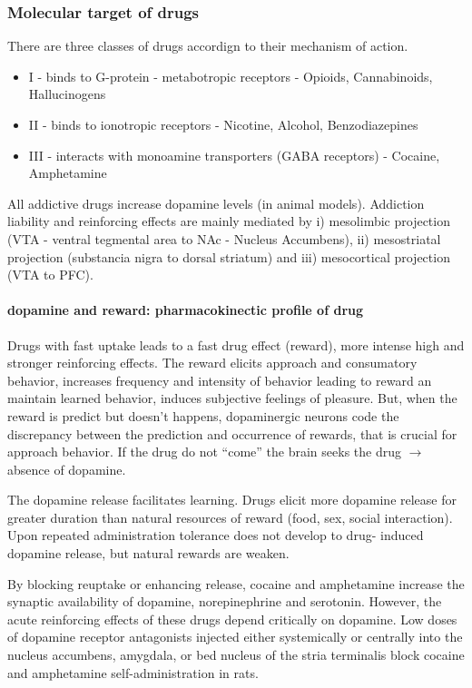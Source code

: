 \documentclass[12pt,article,oneside,a4paper]{memoir}
\begin{document}
\subsubsection{Molecular target of drugs}
There are three classes of drugs accordign to their mechanism of action.

\begin{itemize}
\item I - binds to G-protein - metabotropic receptors - Opioids, Cannabinoids,
Hallucinogens
\item II - binds to ionotropic receptors - Nicotine, Alcohol, Benzodiazepines
\item III - interacts with monoamine transporters (GABA receptors) - Cocaine, Amphetamine
\end{itemize}

All addictive drugs increase dopamine levels (in animal models). Addiction
liability and reinforcing effects are mainly mediated by i) mesolimbic
projection (VTA - ventral tegmental area to NAc - Nucleus Accumbens), ii)
mesostriatal projection (substancia nigra to dorsal striatum) and iii)
mesocortical projection (VTA to PFC).

\paragraph{dopamine and reward: pharmacokinectic profile of drug}
Drugs with fast uptake leads to a fast drug effect (reward), more intense high
and stronger reinforcing effects.
The reward elicits approach and consumatory behavior, increases frequency and
intensity of behavior leading to reward an maintain learned behavior, induces
subjective feelings of pleasure. But, when the reward is predict but doesn't
happens, dopaminergic neurons code the discrepancy between the prediction and
occurrence of rewards, that is crucial for approach behavior. If the drug do
not ``come'' the brain seeks the drug $\rightarrow$ absence of dopamine.

The dopamine release facilitates learning. Drugs elicit more dopamine release
for greater duration than natural resources of reward (food, sex, social
interaction). Upon repeated administration tolerance does not develop to drug-
induced dopamine release, but natural rewards are weaken.

By blocking reuptake or enhancing release, cocaine and amphetamine increase
the synaptic availability of dopamine, norepinephrine and serotonin. However,
the acute reinforcing effects of these drugs depend critically on dopamine.
Low doses of dopamine receptor antagonists injected either systemically or
centrally into the nucleus accumbens, amygdala, or bed nucleus of the stria
terminalis block cocaine and amphetamine self-administration in rats.
\end{document}
